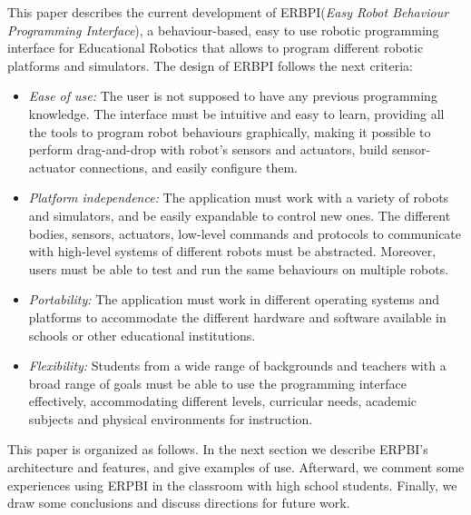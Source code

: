 This paper describes the current development of ERBPI(\emph{Easy Robot Behaviour Programming Interface}), a behaviour-based, easy to use robotic programming interface for Educational Robotics that allows to program different robotic platforms and simulators. The design of ERBPI follows the next criteria:

\begin{itemize}
\item \emph{Ease of use:} The user is not supposed to have any previous programming knowledge. The interface must be intuitive and easy to learn, providing all the tools to program robot behaviours graphically, making it possible to perform drag-and-drop with robot's sensors and actuators, build sensor-actuator connections, and easily configure them. 

\item \emph{Platform independence:} The application must work with a variety of robots and simulators, and be easily expandable to control new ones. The different bodies, sensors, actuators, low-level commands and protocols to communicate with high-level systems of different robots must be abstracted. Moreover, users must be able to test and run the same behaviours on multiple robots.



\item \emph{Portability:} The application must work in different operating systems and platforms to accommodate the different hardware and software available in schools or other educational institutions.  

\item \emph{Flexibility:} Students from a wide range of backgrounds and teachers with a broad range of goals must be able to use the programming interface effectively, accommodating different levels, curricular needs, academic subjects and physical environments for instruction.

\end{itemize}

This paper is organized as follows. In the next section we describe ERPBI's architecture and features, and give examples of use. Afterward, we comment some experiences using ERPBI in the classroom with high school students. Finally, we draw some conclusions and discuss directions for future work.
